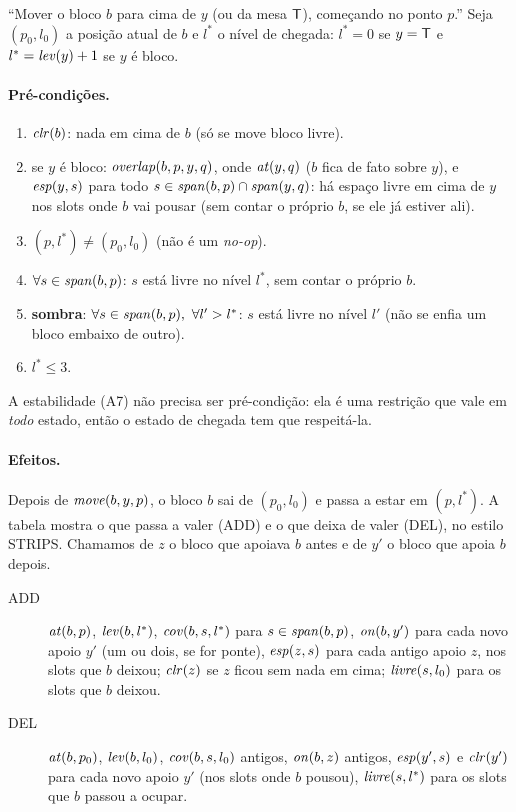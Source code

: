 ``Mover o bloco $b$ para cima de $y$ (ou da mesa $\mathsf{T}$), começando no ponto $p$.''
Seja $(p_0,l_0)$ a posição atual de $b$ e $l^\ast$ o nível de chegada:
$l^\ast=0$ se $y=\mathsf{T}$ e $l^\ast=\mathit{lev}(y)+1$ se $y$ é bloco.

\paragraph{Pré-condições.}
\begin{enumerate}
	\item[P1] $\mathit{clr}(b)$: nada em cima de $b$ (só se move bloco livre).
	\item[P2] se $y$ é bloco: $\mathit{overlap}(b,p,y,q)$, onde $\mathit{at}(y,q)$ ($b$ fica de fato sobre $y$),
	e $\mathit{esp}(y,s)$ para todo $s\in\mathit{span}(b,p)\cap\mathit{span}(y,q)$: há espaço livre em cima
	de $y$ nos slots onde $b$ vai pousar (sem contar o próprio $b$, se ele já
	estiver ali). %
	\item[P3] $(p,l^\ast)\neq(p_0,l_0)$ (não é um \emph{no-op}).
	\item[P4] $\forall s\in\mathit{span}(b,p)$: $s$ está livre no nível $l^\ast$, sem contar o próprio $b$.
	\item[P5] \textbf{sombra}: $\forall s\in\mathit{span}(b,p),\ \forall l'>l^\ast$: $s$ está livre
	no nível $l'$ (não se enfia um bloco embaixo de outro).
	\item[P6] $l^\ast\le 3$.
\end{enumerate}
A estabilidade (A7) não precisa ser pré-condição: ela é uma restrição que vale
em \emph{todo} estado, então o estado de chegada tem que respeitá-la.

\paragraph{Efeitos.}
Depois de $\mathit{move}(b,y,p)$, o bloco $b$ sai de $(p_0,l_0)$ e passa a estar em $(p,l^\ast)$.
A tabela mostra o que passa a valer (ADD) e o que deixa de valer (DEL), no estilo STRIPS.
Chamamos de $z$ o bloco que apoiava $b$ antes e de $y'$ o bloco que apoia $b$ depois.

\begin{description}
	\item[ADD] $\mathit{at}(b,p)$, $\mathit{lev}(b,l^\ast)$, $\mathit{cov}(b,s,l^\ast)$ para $s\in\mathit{span}(b,p)$,
	$\mathit{on}(b,y')$ para cada novo apoio $y'$ (um ou dois, se for ponte),
	$\mathit{esp}(z,s)$ para cada antigo apoio $z$, nos slots que $b$ deixou;
	$\mathit{clr}(z)$ se $z$ ficou sem nada em cima;
	$\mathit{livre}(s,l_0)$ para os slots que $b$ deixou.
	\item[DEL] $\mathit{at}(b,p_0)$, $\mathit{lev}(b,l_0)$, $\mathit{cov}(b,s,l_0)$ antigos,
	$\mathit{on}(b,z)$ antigos, $\mathit{esp}(y',s)$ e $\mathit{clr}(y')$ para cada novo apoio $y'$
	(nos slots onde $b$ pousou),
	$\mathit{livre}(s,l^\ast)$ para os slots que $b$ passou a ocupar.
\end{description}

